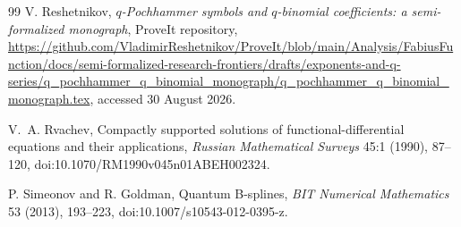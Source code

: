 \documentclass[11pt,oneside]{article}
\numberwithin{equation}{section}
\theoremstyle{definition}
\theoremstyle{remark}
\begin{document}
\begin{thebibliography}{99}
V. Reshetnikov,
\newblock \emph{$q$-Pochhammer symbols and $q$-binomial coefficients: a
semi-formalized monograph},
\newblock ProveIt repository,
\newblock \url{https://github.com/VladimirReshetnikov/ProveIt/blob/main/Analysis/FabiusFunction/docs/semi-formalized-research-frontiers/drafts/exponents-and-q-series/q_pochhammer_q_binomial_monograph/q_pochhammer_q_binomial_monograph.tex},
accessed 30 August 2026.

V.~A. Rvachev,
\newblock Compactly supported solutions of functional-differential equations
and their applications,
\newblock \emph{Russian Mathematical Surveys} 45:1 (1990), 87--120,
\newblock doi:10.1070/RM1990v045n01ABEH002324.

P. Simeonov and R. Goldman,
\newblock Quantum B-splines,
\newblock \emph{BIT Numerical Mathematics} 53 (2013), 193--223,
\newblock doi:10.1007/s10543-012-0395-z.

\end{thebibliography}
\end{document}
